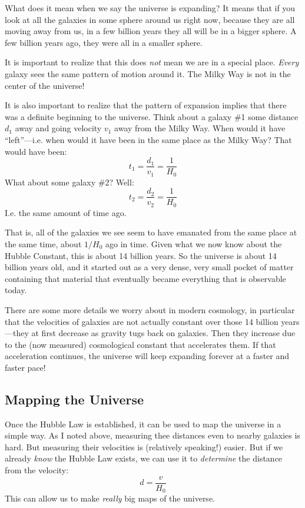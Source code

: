 \documentclass[12pt, preprint]{aastex}
\begin{document}
What does it mean when we say the universe is expanding? It means that
if you look at all the galaxies in some sphere around us right now,
because they are all moving away from us, in a few billion years they
all will be in a bigger sphere. A few billion years ago, they were all
in a smaller sphere.

It is important to realize that this does {\it not} mean we are in a
special place. {\it Every} galaxy sees the same pattern of motion
around it. The Milky Way is not in the center of the universe!

It is also important to realize that the pattern of expansion implies
that there was a definite beginning to the universe. Think about a
galaxy \#1 some distance $d_1$ away and going velocity $v_1$ away from
the Milky Way. When would it have ``left''---i.e. when would it have
been in the same place as the Milky Way? That would have been:
\begin{equation}
t_1 = \frac{d_1}{v_1} = \frac{1}{H_0}
\end{equation}
What about some galaxy \#2? Well:
\begin{equation}
t_2 = \frac{d_2}{v_2} = \frac{1}{H_0}
\end{equation}
I.e. the same amount of time ago.

That is, all of the galaxies we see seem to have emanated from the
same place at the same time, about $1/H_0$ ago in time. Given what we
now know about the Hubble Constant, this is about 14 billion years. So
the universe is about 14 billion years old, and it started out as a
very dense, very small pocket of matter containing that material that
eventually became everything that is observable today.

There are some more details we worry about in modern cosmology, in
particular that the velocities of galaxies are not actually constant
over those 14 billion years---they at first decrease as gravity tugs
back on galaxies. Then they increase due to the (now measured)
cosmological constant that accelerates them. If that acceleration
continues, the universe will keep expanding forever at a faster and
faster pace!

\subsection{Mapping the Universe}

Once the Hubble Law is established, it can be used to map the universe
in a simple way. As I noted above, measuring thee distances even to
nearby galaxies is hard. But measuring their velocities is (relatively
speaking!) easier. But if we already {\it know} the Hubble Law exists,
we can use it to {\it determine} the distance from the velocity:
\begin{equation}
d = \frac{v}{H_0}
\end{equation}
This can allow us to make {\it really} big maps of the universe.
\end{document}
